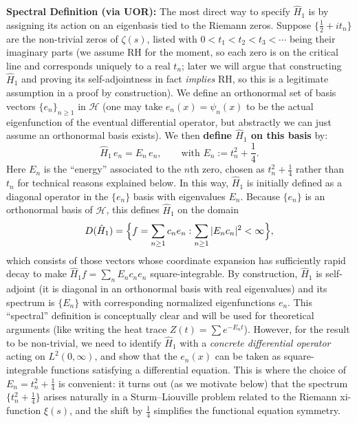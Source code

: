 \documentclass[12pt]{article}
\theoremstyle{plain}
\theoremstyle{definition}
\begin{document}
\textbf{Spectral Definition (via UOR):} The most direct way to specify \(\hat{H}_1\) is by assigning its action on an eigenbasis tied to the Riemann zeros. Suppose \(\{\frac{1}{2}+i t_n\}\) are the non-trivial zeros of \(\zeta(s)\), listed with \(0 < t_1 < t_2 < t_3 < \cdots\) being their imaginary parts (we assume RH for the moment, so each zero is on the critical line and corresponds uniquely to a real \(t_n\); later we will argue that constructing \(\hat{H}_1\) and proving its self-adjointness in fact \emph{implies} RH, so this is a legitimate assumption in a proof by construction). We define an orthonormal set of basis vectors \(\{e_n\}_{n\ge1}\) in \(\mathcal{H}\) (one may take \(e_n(x) = \psi_n(x)\) to be the actual eigenfunction of the eventual differential operator, but abstractly we can just assume an orthonormal basis exists). We then \textbf{define \(\hat{H}_1\) on this basis} by:
\[
\hat{H}_1\, e_n = E_n\, e_n, \qquad \text{with } E_n := t_n^2 + \frac{1}{4}.
\]
Here \(E_n\) is the ``energy'' associated to the \(n\)th zero, chosen as \(t_n^2+\frac{1}{4}\) rather than \(t_n\) for technical reasons explained below. In this way, \(\hat{H}_1\) is initially defined as a diagonal operator in the \(\{e_n\}\) basis with eigenvalues \(E_n\). Because \(\{e_n\}\) is an orthonormal basis of \(\mathcal{H}\), this defines \(\hat{H}_1\) on the domain 
\[
D(\hat{H}_1) = \Bigl\{ f = \sum_{n\ge1} c_n e_n : \sum_{n\ge1} |E_n c_n|^2 < \infty \Bigr\},
\]
which consists of those vectors whose coordinate expansion has sufficiently rapid decay to make \(\hat{H}_1 f = \sum_n E_n c_n e_n\) square-integrable. By construction, \(\hat{H}_1\) is self-adjoint (it is diagonal in an orthonormal basis with real eigenvalues) and its spectrum is \(\{E_n\}\) with corresponding normalized eigenfunctions \(e_n\). This ``spectral'' definition is conceptually clear and will be used for theoretical arguments (like writing the heat trace \(Z(t)=\sum e^{-E_n t}\)). However, for the result to be non-trivial, we need to identify \(\hat{H}_1\) with a \emph{concrete differential operator} acting on \(L^2(0,\infty)\), and show that the \(e_n(x)\) can be taken as square-integrable functions satisfying a differential equation. This is where the choice of \(E_n = t_n^2 + \frac{1}{4}\) is convenient: it turns out (as we motivate below) that the spectrum \(\{t_n^2+\frac{1}{4}\}\) arises naturally in a Sturm--Liouville problem related to the Riemann xi-function \(\xi(s)\), and the shift by \(\frac{1}{4}\) simplifies the functional equation symmetry.
\end{document}
